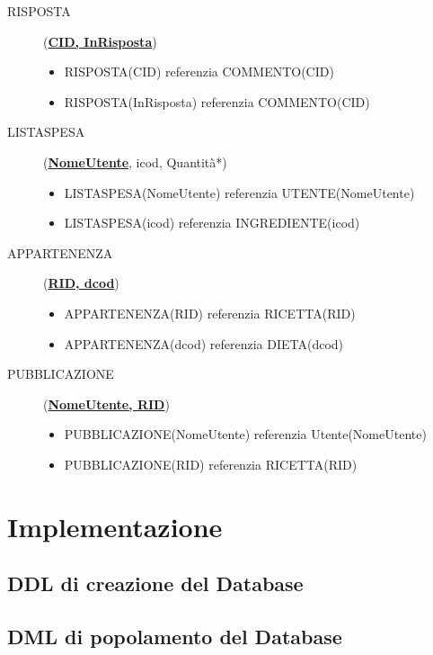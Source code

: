 \documentclass[12pt]{extarticle}
\begin{document}
\begin{description}
    \item[RISPOSTA] (\textbf{\uline{CID, InRisposta}})
    \begin{itemize}
        \item RISPOSTA(CID) referenzia COMMENTO(CID)
        \item RISPOSTA(InRisposta) referenzia COMMENTO(CID)
    \end{itemize}
    \item[LISTASPESA] (\textbf{\uline{NomeUtente}}, icod, Quantità*)
    \begin{itemize}
        \item LISTASPESA(NomeUtente) referenzia UTENTE(NomeUtente) 
        \item LISTASPESA(icod) referenzia INGREDIENTE(icod)
    \end{itemize}   
    \item[APPARTENENZA] (\textbf{\uline{RID, dcod}})
    \begin{itemize}
        \item APPARTENENZA(RID) referenzia RICETTA(RID)
        \item APPARTENENZA(dcod) referenzia DIETA(dcod)
    \end{itemize}
    \item[PUBBLICAZIONE] (\textbf{\uline{NomeUtente, RID}})
    \begin{itemize}
        \item PUBBLICAZIONE(NomeUtente) referenzia Utente(NomeUtente)
        \item PUBBLICAZIONE(RID) referenzia RICETTA(RID)
    \end{itemize} 

    
\end{description}    


\section{Implementazione}
\subsection{DDL di creazione del Database}

    

\subsection{DML di popolamento del Database}


\end{document}
